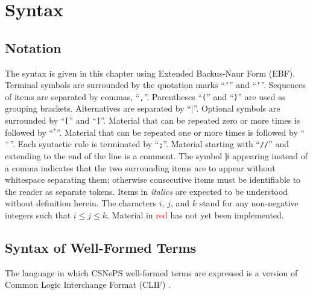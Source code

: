 \documentclass[letterpaper,colorlinks=true,linkcolor=blue]{book}
\begin{document}
\tableofcontents

\cleardoublepage
{}
\listoffigures

\mainmatter

\chapter{Syntax}
\section{Notation}
The syntax is given in this chapter using Extended Backus-Naur Form (EBF).
Terminal symbols are surrounded by the quotation marks ``\texttt{`}'' and
``\texttt{'}''.  Sequences of items are separated by commas, ``\texttt{,}''.
Parentheses ``\texttt{(}'' and ``\texttt{)}'' are used as grouping brackets.
Alternatives are separated by ``$\mid$''.  Optional symbols are surrounded by
``\texttt{[}'' and ``\texttt{]}''.  Material that can be repeated zero or more
times is followed by ``$^\ast$''.  Material that can be repeated one or more
times is followed by ``$^+$''.  Each syntactic rule is terminated by
``\texttt{;}''.  Material starting with ``\texttt{//}'' and extending to the end
of the line is a comment.  The symbol $\not b$ appearing instead of a comma
indicates that the two surrounding items are to appear without whitespace
separating them; otherwise consecutive items must be identifiable to the reader
as separate tokens.  Items in \textit{italics} are expected to be understood
without definition herein.  The characters $i$, $j$, and $k$ stand for any
non-negative integers such that $i \leq j \leq k$.  Material in
\textcolor{red}{red} has not yet been implemented.

\section{Syntax of Well-Formed Terms}
The language in which CSNePS well-formed terms are expressed is a version of
Common Logic Interchange Format (CLIF) \cite{ISO24707}.  
\end{document}
